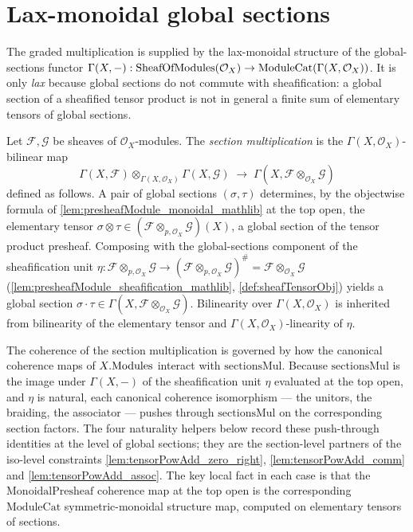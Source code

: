 \section{Lax-monoidal global sections}
\label{sec:sgr_lax_sections}

The graded multiplication is supplied by the lax-monoidal structure of the
global-sections functor \(\Gamma(X, -) : \mathrm{SheafOfModules}(\mathcal{O}_X) \to
\mathrm{ModuleCat}(\Gamma(X, \mathcal{O}_X))\). It is only \emph{lax} because
global sections do not commute with sheafification: a global section of a
sheafified tensor product is not in general a finite sum of elementary tensors of
global sections.

\begin{definition}\leanok
  \label{def:sectionMul}
  Let \(\mathcal{F}, \mathcal{G}\) be sheaves of \(\mathcal{O}_X\)-modules. The
  \emph{section multiplication} is the \(\Gamma(X,\mathcal{O}_X)\)-bilinear map
  \[
    \Gamma(X, \mathcal{F}) \otimes_{\Gamma(X,\mathcal{O}_X)}
      \Gamma(X, \mathcal{G})
    \;\longrightarrow\;
    \Gamma(X, \mathcal{F} \otimes_{\mathcal{O}_X} \mathcal{G})
  \]
  defined as follows. A pair of global sections \((\sigma, \tau)\) determines,
  by the objectwise formula of \cref{lem:presheafModule_monoidal_mathlib} at the
  top open, the elementary tensor \(\sigma \otimes \tau \in
  (\mathcal{F} \otimes_{p,\mathcal{O}_X} \mathcal{G})(X)\), a global section of
  the tensor product presheaf. Composing with the global-sections component of
  the sheafification unit
  \(\eta : \mathcal{F} \otimes_{p,\mathcal{O}_X} \mathcal{G} \to
  (\mathcal{F} \otimes_{p,\mathcal{O}_X} \mathcal{G})^{\#} =
  \mathcal{F} \otimes_{\mathcal{O}_X} \mathcal{G}\)
  (\cref{lem:presheafModule_sheafification_mathlib},
  \cref{def:sheafTensorObj}) yields a global section
  \(\sigma \cdot \tau \in
  \Gamma(X, \mathcal{F} \otimes_{\mathcal{O}_X} \mathcal{G})\). Bilinearity over
  \(\Gamma(X,\mathcal{O}_X)\) is inherited from bilinearity of the elementary
  tensor and \(\Gamma(X,\mathcal{O}_X)\)-linearity of \(\eta\).
\end{definition}

The coherence of the section multiplication is governed by how the canonical
coherence maps of \(X.\mathrm{Modules}\) interact with \(\mathrm{sectionsMul}\). Because
\(\mathrm{sectionsMul}\) is the image under \(\Gamma(X,-)\) of the sheafification
unit \(\eta\) evaluated at the top open, and \(\eta\) is natural, each canonical
coherence isomorphism --- the unitors, the braiding, the associator --- pushes
through \(\mathrm{sectionsMul}\) on the corresponding section factors. The four
naturality helpers below record these push-through identities at the level of
global sections; they are the section-level partners of the iso-level constraints
\cref{lem:tensorPowAdd_zero_right}, \cref{lem:tensorPowAdd_comm} and
\cref{lem:tensorPowAdd_assoc}. The key local fact in each case is that the
\(\mathrm{MonoidalPresheaf}\) coherence map at the top open is the corresponding
\(\mathrm{ModuleCat}\) symmetric-monoidal structure map, computed on elementary
tensors of sections.

